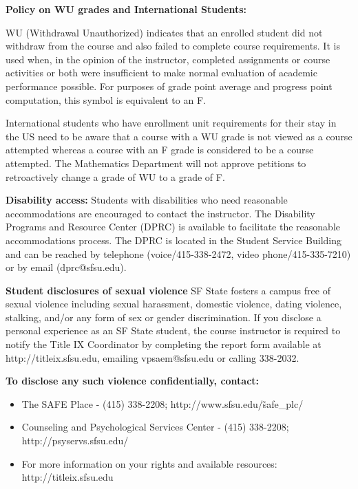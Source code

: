 \documentclass[oneside,12pt]{amsart}
\begin{document}
\textbf{Policy on WU grades and International Students:}

WU (Withdrawal Unauthorized) indicates that an enrolled student did not withdraw from the course and also failed to complete course requirements. It is used when, in the opinion of the instructor, completed assignments or course activities or both were insufficient to make normal evaluation of academic performance possible. For purposes of grade point average and progress point computation, this symbol is equivalent to an F.

International students who have enrollment unit requirements for their stay in the US need to be aware that a course with a WU grade is not viewed as a course attempted whereas a course with an F grade is considered to be a course attempted. The Mathematics Department will not approve petitions to retroactively change a grade of WU to a grade of F.

\textbf{Disability access:}
Students with disabilities who need reasonable accommodations are encouraged to contact
the instructor.  The Disability Programs and Resource Center (DPRC) is available to facilitate
the reasonable accommodations process. The DPRC is located in the Student Service Building
and can be reached by telephone (voice/415-338-2472, video phone/415-335-7210) or by
email (dprc@sfsu.edu).

\textbf{Student disclosures of sexual violence}
SF State fosters a campus free of sexual violence including sexual harassment, domestic
violence, dating violence, stalking, and/or any form of sex or gender discrimination.  If you
disclose a personal experience as an SF State student, the course instructor is required to
notify the Title IX Coordinator by completing the report form available
at http://titleix.sfsu.edu, emailing vpsaem@sfsu.edu or calling 338-2032.

\textbf{To disclose any such violence confidentially, contact:}
\begin{itemize}
\item The SAFE Place - (415) 338-2208; http://www.sfsu.edu/\~safe\_plc/
\item Counseling and Psychological Services Center - (415) 338-2208; http://psyservs.sfsu.edu/
\item For more information on your rights and available resources:  http://titleix.sfsu.edu
\end{itemize}
\end{document}
